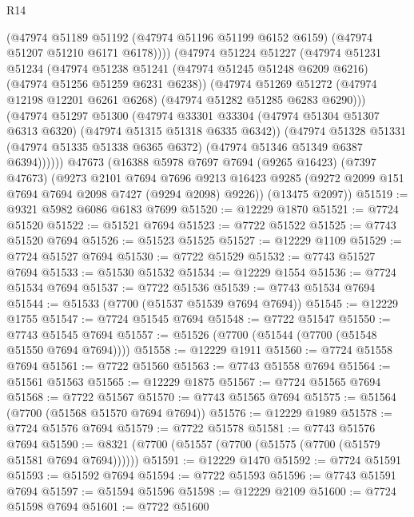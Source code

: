\begin{lexlean}{R14}
\begin{coremodule}
            (@47974
              @51189
              @51192
              (@47974 @51196 @51199 @6152 @6159)
              (@47974 @51207 @51210 @6171 @6178))))
        (@47974
          @51224
          @51227
          (@47974
            @51231
            @51234
            (@47974
              @51238
              @51241
              (@47974 @51245 @51248 @6209 @6216)
              (@47974 @51256 @51259 @6231 @6238))
            (@47974
              @51269
              @51272
              (@47974 @12198 @12201 @6261 @6268)
              (@47974 @51282 @51285 @6283 @6290)))
          (@47974
            @51297
            @51300
            (@47974
              @33301
              @33304
              (@47974 @51304 @51307 @6313 @6320)
              (@47974 @51315 @51318 @6335 @6342))
            (@47974
              @51328
              @51331
              (@47974 @51335 @51338 @6365 @6372)
              (@47974 @51346 @51349 @6387 @6394))))))
    @47673
    (@16388
      @5978
      @7697
      @7694
      (@9265 @16423)
      (@7397 @47673)
      (@9273
        @2101
        @7694
        @7696
        @9213
        @16423
        @9285
        (@9272 @2099 @151 @7694 @7694 @2098 @7427 (@9294 @2098) @9226))
      (@13475 @2097))
@51519 := @9321 @5982 @6086 @6183 @7699
@51520 := @12229 @1870
@51521 := @7724 @51520
@51522 := @51521 @7694
@51523 := @7722 @51522
@51525 := @7743 @51520 @7694
@51526 := @51523 @51525
@51527 := @12229 @1109
@51529 := @7724 @51527 @7694
@51530 := @7722 @51529
@51532 := @7743 @51527 @7694
@51533 := @51530 @51532
@51534 := @12229 @1554
@51536 := @7724 @51534 @7694
@51537 := @7722 @51536
@51539 := @7743 @51534 @7694
@51544 := @51533 (@7700 (@51537 @51539 @7694 @7694))
@51545 := @12229 @1755
@51547 := @7724 @51545 @7694
@51548 := @7722 @51547
@51550 := @7743 @51545 @7694
@51557 := @51526 (@7700 (@51544 (@7700 (@51548 @51550 @7694 @7694))))
@51558 := @12229 @1911
@51560 := @7724 @51558 @7694
@51561 := @7722 @51560
@51563 := @7743 @51558 @7694
@51564 := @51561 @51563
@51565 := @12229 @1875
@51567 := @7724 @51565 @7694
@51568 := @7722 @51567
@51570 := @7743 @51565 @7694
@51575 := @51564 (@7700 (@51568 @51570 @7694 @7694))
@51576 := @12229 @1989
@51578 := @7724 @51576 @7694
@51579 := @7722 @51578
@51581 := @7743 @51576 @7694
@51590 := @8321 (@7700 (@51557 (@7700 (@51575 (@7700 (@51579 @51581 @7694 @7694))))))
@51591 := @12229 @1470
@51592 := @7724 @51591
@51593 := @51592 @7694
@51594 := @7722 @51593
@51596 := @7743 @51591 @7694
@51597 := @51594 @51596
@51598 := @12229 @2109
@51600 := @7724 @51598 @7694
@51601 := @7722 @51600

\end{coremodule}
\end{lexlean}
